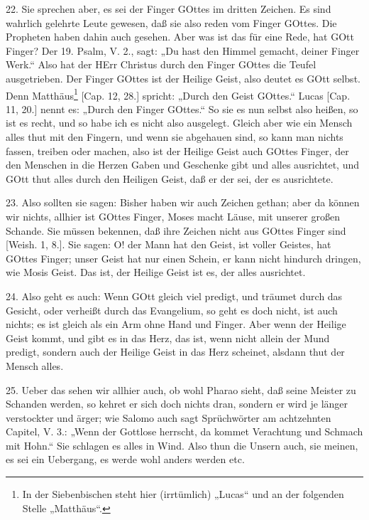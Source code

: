 22. Sie sprechen aber, es sei der Finger GOttes im dritten Zeichen. Es sind wahrlich gelehrte Leute gewesen, daß sie also reden vom Finger GOttes. Die Propheten haben dahin auch gesehen. Aber was ist das für eine Rede, hat GOtt Finger? Der 19. Psalm, V. 2., sagt: „Du hast den Himmel gemacht, deiner Finger Werk.“ Also hat der HErr Christus durch den Finger GOttes die Teufel ausgetrieben. Der Finger GOttes ist der Heilige Geist, also deutet es GOtt selbst. Denn Matthäus\footnote{In der Siebenbischen steht hier (irrtümlich) „Lucas“ und an der folgenden Stelle „Matthäus“.} [Cap. 12, 28.] spricht: „Durch den Geist GOttes.“ Lucas [Cap. 11, 20.] nennt es: „Durch den Finger GOttes.“ So sie es nun selbst also heißen, so ist es recht, und so habe ich es nicht also ausgelegt. Gleich aber wie ein Mensch alles thut mit den Fingern, und wenn sie abgehauen sind, so kann man nichts fassen, treiben oder machen, also ist der Heilige Geist auch GOttes Finger, der den Menschen in die Herzen Gaben und Geschenke gibt und alles ausrichtet, und GOtt thut alles durch den Heiligen Geist, daß er der sei, der es ausrichtete.

23. Also sollten sie sagen: Bisher haben wir auch Zeichen gethan; aber da können wir nichts, allhier ist GOttes Finger, Moses macht Läuse, mit unserer großen Schande. Sie müssen bekennen, daß ihre Zeichen nicht aus GOttes Finger sind [Weish. 1, 8.]. Sie sagen: O! der Mann hat den Geist, ist voller Geistes, hat GOttes Finger; unser Geist hat nur einen Schein, er kann nicht hindurch dringen, wie Mosis Geist. Das ist, der Heilige Geist ist es, der alles ausrichtet.

24. Also geht es auch: Wenn GOtt gleich viel predigt, und träumet durch das Gesicht, oder verheißt durch das Evangelium, so geht es doch nicht, ist auch nichts; es ist gleich als ein Arm ohne Hand und Finger. Aber wenn der Heilige
Geist kommt, und gibt es in das Herz, das ist, wenn nicht allein der Mund predigt, sondern auch der Heilige Geist in das Herz scheinet, alsdann thut der Mensch alles.

25. Ueber das sehen wir allhier auch, ob wohl Pharao sieht, daß seine Meister zu Schanden werden, so kehret er sich doch nichts dran, sondern er wird je länger verstockter und ärger; wie Salomo auch sagt Sprüchwörter am achtzehnten Capitel, V. 3.: „Wenn der Gottlose herrscht, da kommet Verachtung und Schmach mit Hohn.“ Sie schlagen es alles in Wind. Also thun die Unsern auch, sie meinen, es sei ein Uebergang, es werde wohl anders werden etc.

